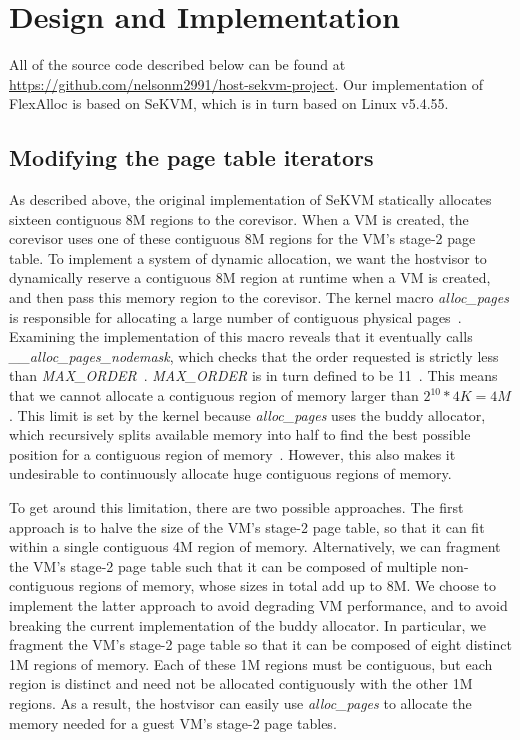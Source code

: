 \section{Design and Implementation}

All of the source code described below can be found at \url{https://github.com/nelsonm2991/host-sekvm-project}.
Our implementation of FlexAlloc is based on SeKVM, which is in turn based on Linux v5.4.55.

\subsection{Modifying the page table iterators}

As described above, the original implementation of SeKVM statically
allocates sixteen contiguous 8M regions to the corevisor. When a VM is created,
the corevisor uses one of these contiguous 8M regions for the VM's stage-2
page table. To implement a system of dynamic allocation, we want the hostvisor
to dynamically reserve a contiguous 8M region at runtime when a VM is created, and then
pass this memory region to the corevisor. The kernel macro \textit{alloc\_pages}
is responsible for allocating a large number of contiguous physical pages~\cite{kerneldocs}.
Examining the implementation of this macro reveals that it eventually
calls \textit{\_\_alloc\_pages\_nodemask}, which checks that the order requested
is strictly less than \textit{MAX\_ORDER}~\cite{page_alloc.c}. \textit{MAX\_ORDER}
is in turn defined to be 11~\cite{mmzone.h}. This means that we cannot allocate
a contiguous region of memory larger than $2^{10} * 4K = 4M$. This
limit is set by the kernel because \textit{alloc\_pages} uses the buddy allocator,
which recursively splits available memory into half to find the best possible position for
a contiguous region of memory~\cite{kerneldocs}. However, this also makes it
undesirable to continuously allocate huge contiguous regions of memory.

To get around this limitation, there are two possible approaches. The first approach
is to halve the size of the VM's stage-2 page table, so that it can fit within
a single contiguous 4M region of memory. Alternatively, we can fragment the VM's stage-2
page table such that it can be composed of multiple non-contiguous regions of memory, whose sizes in total add up to 8M. We
choose to implement the latter approach to avoid degrading VM performance, and to avoid
breaking the current implementation of the buddy allocator. In
particular, we fragment the VM's stage-2 page table so that it can be composed
of eight distinct 1M regions of memory. Each of these 1M regions must be contiguous,
but each region is distinct and need not be allocated contiguously with the
other 1M regions. As a result, the hostvisor can easily use \textit{alloc\_pages}
to allocate the memory needed for a guest VM's stage-2 page tables.

